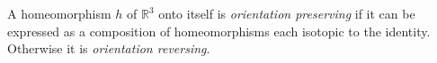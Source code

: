 A homeomorphism $h$ of $\mathbb{R}^3$ onto itself is \textit{orientation preserving} if it can be expressed as a composition of homeomorphisms each isotopic to the identity. Otherwise it is \textit{orientation reversing}.
